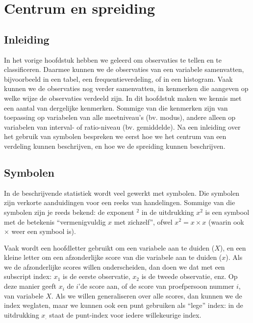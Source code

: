 \documentclass[
]{book}
\begin{document}
\hypertarget{ch:centrumenspreiding}{%
\chapter{Centrum en spreiding}\label{ch:centrumenspreiding}}

\hypertarget{inleiding-4}{%
\section{Inleiding}\label{inleiding-4}}

In het vorige hoofdstuk hebben we geleerd om observaties te tellen en te
classificeren. Daarmee kunnen we de observaties van een variabele
samenvatten, bijvoorbeeld in een tabel, een frequentieverdeling, of in
een histogram. Vaak kunnen we de observaties nog verder samenvatten, in
kenmerken die aangeven op welke wijze de observaties verdeeld zijn. In
dit hoofdstuk maken we kennis met een aantal van dergelijke kenmerken.
Sommige van die kenmerken zijn van toepassing op variabelen van alle
meetniveau's (bv. modus), andere alleen op variabelen van interval- of
ratio-niveau (bv. gemiddelde). Na een inleiding over het gebruik van
symbolen bespreken we eerst hoe we het centrum van een verdeling kunnen
beschrijven, en hoe we de spreiding kunnen beschrijven.

\hypertarget{symbolen}{%
\section{Symbolen}\label{symbolen}}

In de beschrijvende statistiek wordt veel gewerkt met symbolen. Die
symbolen zijn verkorte aanduidingen voor een reeks van handelingen.
Sommige van die symbolen zijn je reeds bekend: de exponent \({}^2\) in de
uitdrukking \(x^2\) is een symbool met de betekenis ``vermenigvuldig \(x\)
met zichzelf'', ofwel \(x^2 = x \times x\) (waarin ook \(\times\) weer een
symbool is).

Vaak wordt een hoofdletter gebruikt om een variabele aan te duiden
(\(X\)), en een kleine letter om een afzonderlijke score van die variabele
aan te duiden (\(x\)). Als we de afzonderlijke scores willen
onderscheiden, dan doen we dat met een subscript index: \(x_1\) is de
eerste observatie, \(x_2\) is de tweede observatie, enz. Op deze manier
geeft \(x_i\) de \(i\)'de score aan, of de score van proefpersoon nummer
\(i\), van variabele \(X\). Als we willen generaliseren over alle scores,
dan kunnen we de index weglaten, maar we kunnen ook een punt gebruiken
als ``lege'' index: in de uitdrukking \(x_.\) staat de punt-index voor
iedere willekeurige index.
\end{document}

